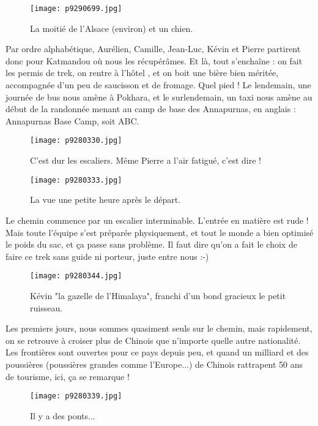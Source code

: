 \documentclass{book}
\begin{document}
\begin{figure}[h]
\centering
\texttt{[image: p9290699.jpg]}
\caption*{La moitié de l'Alsace (environ) et un chien.}
\end{figure}

Par ordre alphabétique, Aurélien, Camille, Jean-Luc, Kévin et Pierre partirent donc pour Katmandou où nous les récupérâmes. Et là, tout s'enchaîne : on fait les permis de trek, on rentre à l'hôtel , et on boit une bière bien méritée, accompagnée d'un peu de saucisson et de fromage. Quel pied ! Le lendemain, une journée de bus nous amène à Pokhara, et le surlendemain, un taxi nous amène au début de la randonnée menant au camp de base des Annapurnas, en anglais : Annapurnas Base Camp, soit ABC.


\begin{figure}[h]
\centering
\texttt{[image: p9280330.jpg]}
\caption*{C'est dur les escaliers. Même Pierre a l'air fatigué, c'est dire !}
\end{figure}


\begin{figure}[h]
\centering
\texttt{[image: p9280333.jpg]}
\caption*{La vue une petite heure après le départ.}
\end{figure}

Le chemin commence par un escalier interminable. L'entrée en matière est rude ! Mais toute l'équipe s'est préparée physiquement, et tout le monde a bien optimisé le poids du sac, et ça passe sans problème. Il faut dire qu'on a fait le choix de faire ce trek sans guide ni porteur, juste entre nous :-)


\begin{figure}[h]
\centering
\texttt{[image: p9280344.jpg]}
\caption*{Kévin "la gazelle de l'Himalaya", franchi d'un bond gracieux le petit ruisseau.}
\end{figure}

Les premiers jours, nous sommes quasiment seuls sur le chemin, mais rapidement, on se retrouve à croiser plus de Chinois que n'importe quelle autre nationalité. Les frontières sont ouvertes pour ce pays depuis peu, et quand un milliard et des poussières (poussières grandes comme l'Europe...) de Chinois rattrapent 50 ans de tourisme, ici, ça se remarque !


\begin{figure}[h]
\centering
\texttt{[image: p9280339.jpg]}
\caption*{Il y a des ponts...}
\end{figure}
\end{document}
